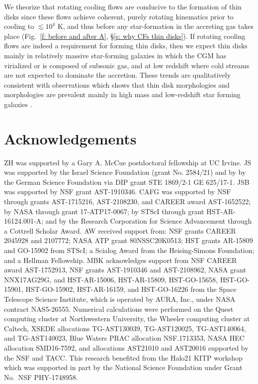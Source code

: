 \documentclass[fleqn,usenatbib]{mnras}
\begin{document}
\begin{enumerate}
    We theorize that rotating cooling flows are conducive to the formation of thin disks since these flows achieve coherent, purely rotating kinematics prior to cooling to $\lesssim10^4$ K, and thus before any star-formation in the accreting gas takes place (Fig.~\ref{f: before and after A}, \S\ref{s: why CFs thin disks}).
    If rotating cooling flows are indeed a requirement for forming thin disks, then we expect thin disks mainly in relatively massive star-forming galaxies in which the CGM has virialized or is composed of subsonic gas, and at low redshift where cold streams are not expected to dominate the accretion.
    These trends are qualitatively consistent with observations which shows that thin disk morphologies and morphologies are prevalent mainly in high mass and low-redshift star forming galaxies \citep{Kassin2012, Simons2017}. 
\end{enumerate}

\section*{Acknowledgements}

ZH was supported by a Gary A. McCue postdoctoral fellowship at UC Irvine.
JS was supported by the Israel Science Foundation (grant No. 2584/21) and by by the German Science Foundation via DIP grant STE 1869/2-1 GE 625/17-1. 
JSB was supported by NSF grant AST-1910346.
CAFG was supported by NSF through grants AST-1715216, AST-2108230,  and CAREER award AST-1652522; by NASA through grant 17-ATP17-0067; by STScI through grant HST-AR-16124.001-A; and by the Research Corporation for Science Advancement through a Cottrell Scholar Award.
AW received support from: NSF grants CAREER 2045928 and 2107772; NASA ATP grant 80NSSC20K0513; HST grants AR-15809 and GO-15902 from STScI; a Scialog Award from the Heising-Simons Foundation; and a Hellman Fellowship.
MBK acknowledges support from NSF CAREER award AST-1752913, NSF grants AST-1910346 and AST-2108962, NASA grant NNX17AG29G, and HST-AR-15006, HST-AR-15809, HST-GO-15658, HST-GO-15901, HST-GO-15902, HST-AR-16159, and HST-GO-16226 from the Space Telescope Science Institute, which is operated by AURA, Inc., under NASA contract NAS5-26555.
Numerical calculations were performed on the Quest computing cluster at Northwestern University, the Wheeler computing cluster at Caltech, XSEDE allocations TG-AST130039, TG-AST120025, TG-AST140064, and TG-AST140023, Blue Waters PRAC allocation NSF.1713353, NASA HEC allocation SMD16-7592, and allocations AST21010 and AST20016 supported by the NSF and TACC.
This research benefited from the Halo21 KITP workshop which was supported in part by the National Science Foundation under Grant No.~NSF PHY-1748958.
\end{document}
